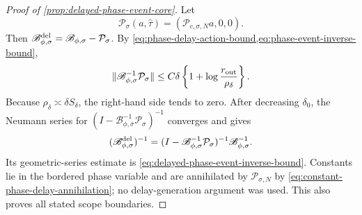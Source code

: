 \begin{proof}[Proof of \cref{prop:delayed-phase-event-core}]
Let
\[
 \mathcal P_\sigma(a,\widehat\tau)
   =(\mathscr P_{c,\sigma,N}a,0,0).
\]
Then
\(
 \mathscr B_{\phi,\sigma}^{\rm del}
 =\mathscr B_{\phi,\sigma}-\mathcal P_\sigma
\).
By \cref{eq:phase-delay-action-bound,eq:phase-event-inverse-bound},
\begin{equation*}
 \|\mathscr B_{\phi,\sigma}^{-1}\mathcal P_\sigma\|
 \le C\delta\left\{1+
          \log\frac{r_{\rm out}}{\rho_\delta}\right\}.
\end{equation*}
Because \(\rho_\delta\asymp\delta S_\delta\), the right-hand side tends
to zero.  After decreasing \(\delta_0\), the Neumann series for
\(
 (I-\mathscr B_{\phi,\sigma}^{-1}\mathcal P_\sigma)^{-1}
\)
converges and gives
\[
 (\mathscr B_{\phi,\sigma}^{\rm del})^{-1}
 =(I-\mathscr B_{\phi,\sigma}^{-1}\mathcal P_\sigma)^{-1}
       \mathscr B_{\phi,\sigma}^{-1}.
\]
Its geometric-series estimate is
\cref{eq:delayed-phase-event-inverse-bound}.  Constants lie in the
bordered phase variable and are annihilated by \(\mathscr P_{\sigma,N}\)
by \cref{eq:constant-phase-delay-annihilation}; no delay-generation
argument was used.  This also proves all stated scope boundaries.
\end{proof}

